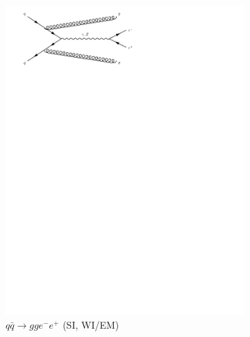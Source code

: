 \begin{figure}[h]
\begin{subfigure}[b]{0.3\textwidth}
    \includegraphics[trim={0.5cm 22cm 10cm 0cm},width=\textwidth]{../Diagrams/D16.pdf}
    \caption{$q\bar{q}\rightarrow gge^-e^+$ (SI, WI/EM)}
    \label{fey:16}
  \end{subfigure}
  ~
  \begin{subfigure}[b]{0.3\textwidth}

\end{subfigure}
\end{figure}
